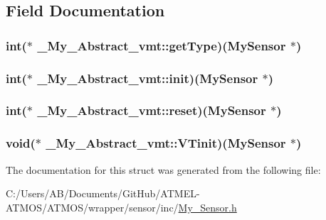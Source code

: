 \subsection{Field Documentation}
\hypertarget{struct___my___abstract__vmt_afa39974172b5cb02e5bb29c28628fde7}{
\subsubsection[{get\-Type}]{\setlength{\rightskip}{0pt plus 5cm}int($\ast$ \-\_\-\-My\-\_\-\-Abstract\-\_\-vmt\-::get\-Type)({\bf My\-Sensor} $\ast$)}}\label{struct___my___abstract__vmt_afa39974172b5cb02e5bb29c28628fde7}
\hypertarget{struct___my___abstract__vmt_a8f309bfdf6a70191aaa8c53a1ce55d83}{
\subsubsection[{init}]{\setlength{\rightskip}{0pt plus 5cm}int($\ast$ \-\_\-\-My\-\_\-\-Abstract\-\_\-vmt\-::init)({\bf My\-Sensor} $\ast$)}}\label{struct___my___abstract__vmt_a8f309bfdf6a70191aaa8c53a1ce55d83}
\hypertarget{struct___my___abstract__vmt_a825ffb364bcce5bb1ebfec3a61fd399c}{
\subsubsection[{reset}]{\setlength{\rightskip}{0pt plus 5cm}int($\ast$ \-\_\-\-My\-\_\-\-Abstract\-\_\-vmt\-::reset)({\bf My\-Sensor} $\ast$)}}\label{struct___my___abstract__vmt_a825ffb364bcce5bb1ebfec3a61fd399c}
\hypertarget{struct___my___abstract__vmt_a2c999bc46b0745aa624051ac48d3347e}{
\subsubsection[{V\-Tinit}]{\setlength{\rightskip}{0pt plus 5cm}void($\ast$ \-\_\-\-My\-\_\-\-Abstract\-\_\-vmt\-::\-V\-Tinit)({\bf My\-Sensor} $\ast$)}}\label{struct___my___abstract__vmt_a2c999bc46b0745aa624051ac48d3347e}


The documentation for this struct was generated from the following file\-:\begin{DoxyCompactItemize}
\item 
C\-:/\-Users/\-A\-B/\-Documents/\-Git\-Hub/\-A\-T\-M\-E\-L-\/\-A\-T\-M\-O\-S/\-A\-T\-M\-O\-S/wrapper/sensor/inc/\hyperlink{_my___sensor_8h}{My\-\_\-\-Sensor.\-h}\end{DoxyCompactItemize}
